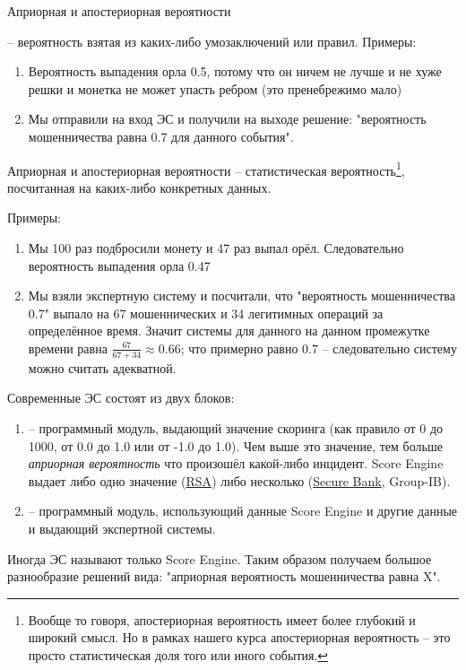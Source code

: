   \begin{frame}{Априорная и апостериорная вероятности}
  
   -- вероятность взятая из каких-либо умозаключений или правил.
  Примеры:
  \begin{enumerate}
  	\item Вероятность выпадения орла 0.5, потому что он ничем не лучше и не хуже решки и монетка не может упасть ребром (это пренебрежимо мало)
  	\item Мы отправили  на вход ЭС и получили на выходе решение: "вероятность мошенничества равна 0.7 для данного события".
  \end{enumerate}
   
  \end{frame}

  \begin{frame}{Априорная и апостериорная вероятности}
  	\small
{} -- статистическая вероятность\footnote{
	Вообще то говоря, апостериорная вероятность имеет более глубокий и широкий смысл.
	Но в рамках нашего курса апостериорная вероятность -- это просто статистическая доля того или иного события.}, посчитанная на каких-либо конкретных данных.

	Примеры: \small
	\begin{enumerate}
		\item Мы 100 раз подбросили монету и 47 раз выпал орёл. Следовательно 
		вероятность выпадения орла 0.47
		\item Мы взяли экспертную систему и посчитали, что "вероятность мошенничества 0.7"
		выпало на 67 мошеннических и 34 легитимных операций за определённое время. 
		Значит  системы для данного  на данном промежутке времени равна $\frac{67}{67+34} \approx 0.66$; что примерно равно $0.7$ -- следовательно систему можно считать адекватной.
	\end{enumerate}
\end{frame}
  
  \begin{frame}
  Современные ЭС состоят из двух блоков:
  \begin{enumerate}
  	\item {} -- программный модуль, выдающий значение скоринга (как правило от 0 до 1000, от 0.0 до 1.0 или от -1.0 до 1.0). Чем выше это значение, тем больше
  	\textit{априорная вероятность} что произошёл какой-либо инцидент.
  	Score Engine выдает либо одно значение (\href{https://www.rsa.com/en-us/products/fraud-prevention}{RSA}) 
  	либо несколько (\href{https://www.group-ib.ru/secure-bank.html}{Secure Bank}, Group-IB).
  	\item {} -- программный модуль, использующий данные Score Engine и другие данные 
  	и выдающий  экспертной системы.
  \end{enumerate}

  Иногда ЭС называют только Score Engine. Таким образом получаем большое разнообразие решений вида: "априорная вероятность мошенничества равна X".
  \end{frame}
  
